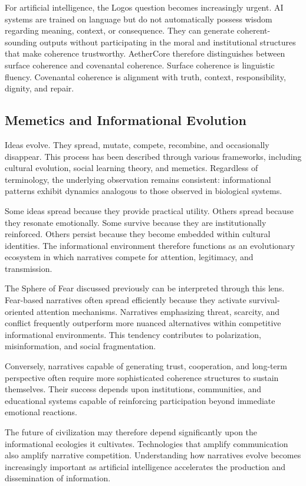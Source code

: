 \documentclass[12pt]{article}
\begin{document}
For artificial intelligence, the Logos question becomes increasingly urgent. AI systems are trained on language but do not automatically possess wisdom regarding meaning, context, or consequence. They can generate coherent-sounding outputs without participating in the moral and institutional structures that make coherence trustworthy. AetherCore therefore distinguishes between surface coherence and covenantal coherence. Surface coherence is linguistic fluency. Covenantal coherence is alignment with truth, context, responsibility, dignity, and repair.

\subsection{Memetics and Informational Evolution}

Ideas evolve. They spread, mutate, compete, recombine, and occasionally disappear. This process has been described through various frameworks, including cultural evolution, social learning theory, and memetics. Regardless of terminology, the underlying observation remains consistent: informational patterns exhibit dynamics analogous to those observed in biological systems.

Some ideas spread because they provide practical utility. Others spread because they resonate emotionally. Some survive because they are institutionally reinforced. Others persist because they become embedded within cultural identities. The informational environment therefore functions as an evolutionary ecosystem in which narratives compete for attention, legitimacy, and transmission.

The Sphere of Fear discussed previously can be interpreted through this lens. Fear-based narratives often spread efficiently because they activate survival-oriented attention mechanisms. Narratives emphasizing threat, scarcity, and conflict frequently outperform more nuanced alternatives within competitive informational environments. This tendency contributes to polarization, misinformation, and social fragmentation.

Conversely, narratives capable of generating trust, cooperation, and long-term perspective often require more sophisticated coherence structures to sustain themselves. Their success depends upon institutions, communities, and educational systems capable of reinforcing participation beyond immediate emotional reactions.

The future of civilization may therefore depend significantly upon the informational ecologies it cultivates. Technologies that amplify communication also amplify narrative competition. Understanding how narratives evolve becomes increasingly important as artificial intelligence accelerates the production and dissemination of information.
\end{document}
